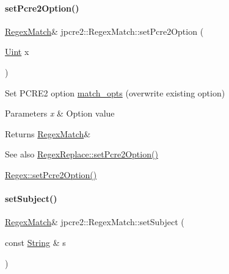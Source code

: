 \paragraph{\texorpdfstring{set\+Pcre2\+Option()}{setPcre2Option()}}
{\footnotesize\ttfamily \hyperlink{classjpcre2_1_1RegexMatch}{Regex\+Match}\& jpcre2\+::\+Regex\+Match\+::set\+Pcre2\+Option (\begin{DoxyParamCaption}\item[{\hyperlink{namespacejpcre2_a078242d38221a13fb3543b9edd78c099}{Uint}}]{x }\end{DoxyParamCaption})\hspace{0.3cm}{\ttfamily [inline]}}



Set P\+C\+R\+E2 option \hyperlink{classjpcre2_1_1RegexMatch_a697d5731007350b0f20d2018fcfafa90}{match\+\_\+opts} (overwrite existing option) 


\begin{DoxyParams}{Parameters}
{\em x} & Option value \\
\hline
\end{DoxyParams}
\begin{DoxyReturn}{Returns}
\hyperlink{classjpcre2_1_1RegexMatch}{Regex\+Match}\& 
\end{DoxyReturn}
\begin{DoxySeeAlso}{See also}
\hyperlink{classjpcre2_1_1RegexReplace_aec36272d351fdc3a8cb02a4a3efea5a2_aec36272d351fdc3a8cb02a4a3efea5a2}{Regex\+Replace\+::set\+Pcre2\+Option()} 

\hyperlink{classjpcre2_1_1Regex_acdc6f97f4030ae109c4e1a4e2310bceb_acdc6f97f4030ae109c4e1a4e2310bceb}{Regex\+::set\+Pcre2\+Option()} 
\end{DoxySeeAlso}
\hypertarget{classjpcre2_1_1RegexMatch_a635c652195deaa8ebb9e107c4f972aab_a635c652195deaa8ebb9e107c4f972aab}{}\label{classjpcre2_1_1RegexMatch_a635c652195deaa8ebb9e107c4f972aab_a635c652195deaa8ebb9e107c4f972aab} 
\paragraph{\texorpdfstring{set\+Subject()}{setSubject()}}
{\footnotesize\ttfamily \hyperlink{classjpcre2_1_1RegexMatch}{Regex\+Match}\& jpcre2\+::\+Regex\+Match\+::set\+Subject (\begin{DoxyParamCaption}\item[{const \hyperlink{namespacejpcre2_a91f03070152fb228bc116c5a737f1d16}{String} \&}]{s }\end{DoxyParamCaption})\hspace{0.3cm}{\ttfamily [inline]}}



